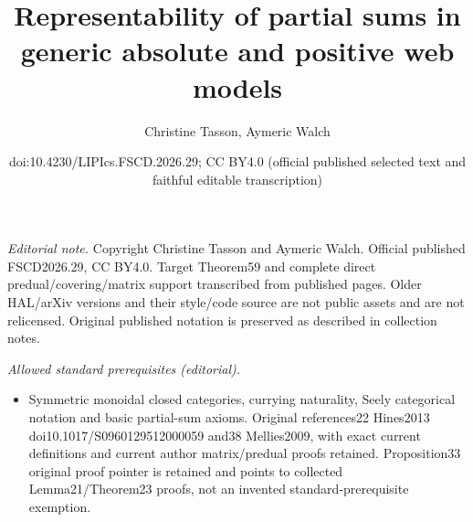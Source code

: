 \documentclass[10pt,a4paper]{article}
\title{Representability of partial sums in generic absolute and positive web models}
\author{Christine Tasson, Aymeric Walch}
\date{doi:10.4230/LIPIcs.FSCD.2026.29; CC BY4.0 (official published selected text and faithful editable transcription)}
\begin{document}
\maketitle
\noindent\textit{Editorial note.} Copyright Christine Tasson and Aymeric Walch. Official published FSCD2026.29, CC BY4.0. Target Theorem59 and complete direct predual/covering/matrix support transcribed from published pages. Older HAL/arXiv versions and their style/code source are not public assets and are not relicensed. Original published notation is preserved as described in collection notes.\par\medskip
\noindent\textit{Allowed standard prerequisites (editorial).}\begin{itemize}
\item Symmetric monoidal closed categories, currying naturality, Seely categorical notation and basic partial-sum axioms. Original references22 Hines2013 doi10.1017/S0960129512000059 and38 Mellies2009, with exact current definitions and current author matrix/predual proofs retained. Proposition33 original proof pointer is retained and points to collected Lemma21/Theorem23 proofs, not an invented standard-prerequisite exemption.
\end{itemize}\medskip
\end{document}
